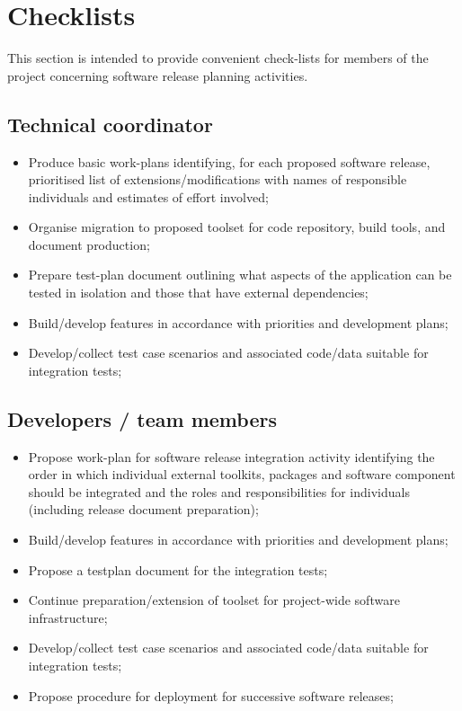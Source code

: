 \section{Checklists}

\noindent This section is intended to provide convenient check-lists for members of the project concerning software release planning activities.

\subsection{Technical coordinator}
\begin{itemize}
\item Produce basic work-plans identifying, for each proposed software release, prioritised list of extensions/modifications with names of responsible individuals and estimates of effort involved;
\item Organise migration to proposed toolset for code repository, build tools, and document production;
\item Prepare test-plan document outlining what aspects of the application can be tested in isolation and those that have external dependencies;
\item Build/develop features in accordance with priorities and development plans;
\item Develop/collect test case scenarios and associated code/data suitable for integration tests;
\end{itemize}

\subsection{Developers / team members}

\begin{itemize}
\item Propose work-plan for software release integration activity identifying the order in which individual external toolkits, packages and software component should be integrated and the roles and responsibilities for individuals (including release document preparation);
\item Build/develop features in accordance with priorities and development plans;
\item Propose a testplan document for the integration tests;
\item Continue preparation/extension of toolset for project-wide software infrastructure;
\item Develop/collect test case scenarios and associated code/data suitable for integration tests;
\item Propose procedure for deployment for successive software releases;
\end{itemize}